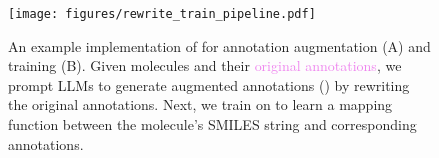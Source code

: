 \begin{figure}[!ht]
\centering
\texttt{[image: figures/rewrite\_train\_pipeline.pdf]}
\caption{
An example implementation of \pipeline for annotation augmentation (A) and training (B).
Given molecules and their \textcolor{violet}{original annotations}, we prompt LLMs to generate \textcolor{oceanboatblue}{augmented annotations} (\newdataset) by rewriting the original annotations. 
Next, we train \newmodel on \newdataset to learn a mapping function between the molecule's SMILES string and corresponding annotations.  
}
\vspace{-3mm}
\label{fig:rewrite_training_pipeline}
\end{figure}
